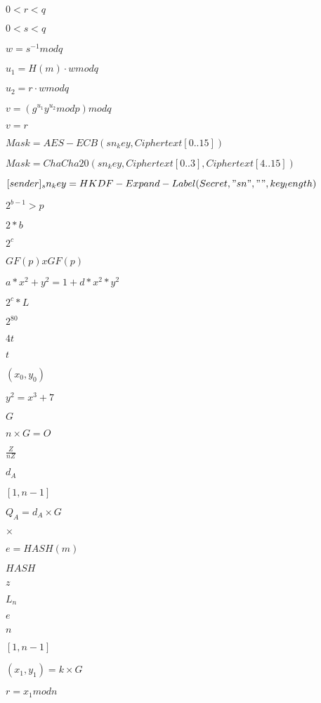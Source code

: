 \documentclass{article}
\begin{document}
$ 0 < r < q$
\pagebreak

$ 0 < s < q$
\pagebreak

$ w = {s}^{-1} mod q$
\pagebreak

$ u_1 = H(m) \cdot w mod q$
\pagebreak

$ u_2 = r \cdot w mod q$
\pagebreak

$ v = ({g}^{u_1} {y}^{u_2} mod p ) mod q$
\pagebreak

$ v = r$
\pagebreak

$ Mask = AES-ECB(sn_key, Ciphertext[0..15]) $
\pagebreak

$ Mask = ChaCha20(sn_key, Ciphertext[0..3], Ciphertext[4..15]) $
\pagebreak

$ [sender]_sn_key = HKDF-Expand-Label(Secret, "sn", "", key_length) $
\pagebreak

$ {2}^{b-1} > p $
\pagebreak

$ 2*b $
\pagebreak

$ {2}^{c} $
\pagebreak

$ GF(p) x GF(p) $
\pagebreak

$ a * {x}^{2} + {y}^{2} = 1 + d * {x}^{2} * {y}^{2} $
\pagebreak

$ {2}^{c} * L $
\pagebreak

$ {2}^{80} $
\pagebreak

$ 4t$
\pagebreak

$ t$
\pagebreak

$(x_0,y_0)$
\pagebreak

$ {y}^{2} = {x}^{3} + 7$
\pagebreak

$ G$
\pagebreak

$ n \times G = O$
\pagebreak

$ \frac{Z}{nZ}$
\pagebreak

$ d_A$
\pagebreak

$ [ 1 , n - 1 ]$
\pagebreak

$ Q_A = d_A \times G$
\pagebreak

$ \times$
\pagebreak

$ e = HASH(m)$
\pagebreak

$ HASH$
\pagebreak

$ z$
\pagebreak

$ L_n$
\pagebreak

$ e$
\pagebreak

$ n$
\pagebreak

$ [1 , n - 1]$
\pagebreak

$ (x_1, y_1) = k \times G$
\pagebreak

$ r = x_1 mod n$
\pagebreak
\end{document}

